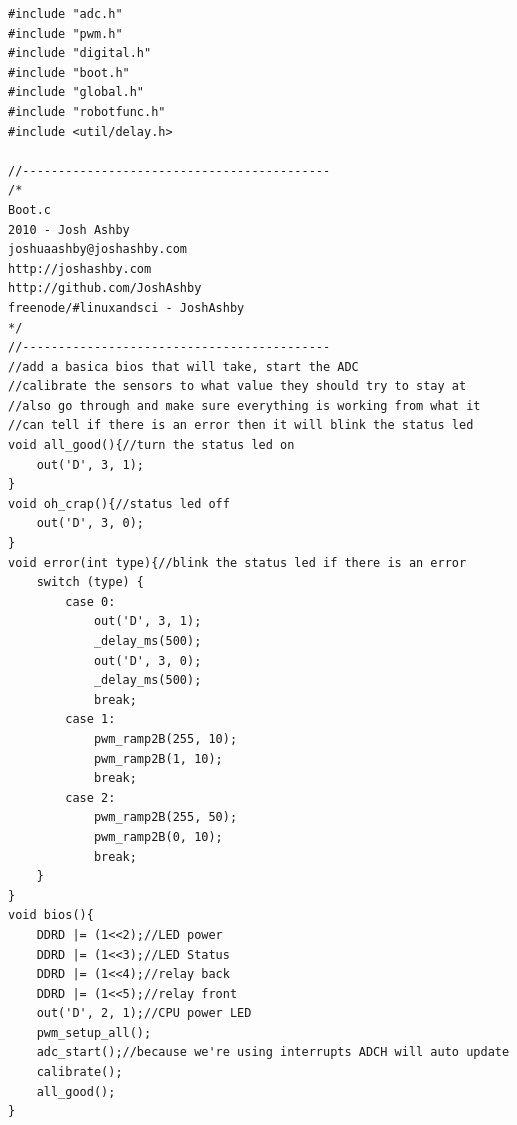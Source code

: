\documentclass{article}
\begin{document}
\begin{lstlisting}[caption={The boot function library.},label=boot,frame=tbl]
#include "adc.h"
#include "pwm.h"
#include "digital.h"
#include "boot.h"
#include "global.h"
#include "robotfunc.h"
#include <util/delay.h>

//-------------------------------------------
/*
Boot.c
2010 - Josh Ashby
joshuaashby@joshashby.com
http://joshashby.com
http://github.com/JoshAshby
freenode/#linuxandsci - JoshAshby
*/
//-------------------------------------------
//add a basica bios that will take, start the ADC
//calibrate the sensors to what value they should try to stay at
//also go through and make sure everything is working from what it
//can tell if there is an error then it will blink the status led
void all_good(){//turn the status led on
    out('D', 3, 1);
}
void oh_crap(){//status led off
    out('D', 3, 0);
}
void error(int type){//blink the status led if there is an error
    switch (type) {
        case 0:
            out('D', 3, 1);
            _delay_ms(500);
            out('D', 3, 0);
            _delay_ms(500);
            break;
        case 1:
            pwm_ramp2B(255, 10);
            pwm_ramp2B(1, 10);
            break;
        case 2:
            pwm_ramp2B(255, 50);
            pwm_ramp2B(0, 10);
            break;
    }
}
void bios(){
    DDRD |= (1<<2);//LED power
    DDRD |= (1<<3);//LED Status
    DDRD |= (1<<4);//relay back
    DDRD |= (1<<5);//relay front
    out('D', 2, 1);//CPU power LED
    pwm_setup_all();
    adc_start();//because we're using interrupts ADCH will auto update
    calibrate();
    all_good();
}

\end{lstlisting}
\end{document}

